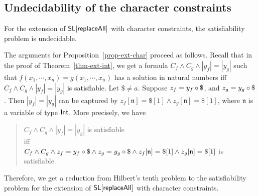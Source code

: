 
\subsection{Undecidability of the character constraints}

\begin{proposition}\label{prop-ext-char}
	For the extension of $\mathsf{SL}[\mathsf{replaceAll}]$ with character constraints, the satisfiability problem is undecidable. 
\end{proposition}

The arguments for Proposition~\ref{prop-ext-char} proceed as follows. Recall that in the proof of Theorem~\ref{thm-ext-int}, we get a formula $C_f \wedge C_g \wedge |y_f| = |y_g|$ such that $f(x_1,\cdots, x_n) = g(x_1,\cdots, x_n)$ has a solution in natural numbers iff $C_f \wedge C_g \wedge |y_f| = |y_g|$ is satisfiable. Let $\$ \neq a$. Suppose  $z_f = y_f \concat \$$, and $z_g = y_g \concat \$$. Then $|y_f| = |y_g|$ can be captured by $z_f[\mathfrak{n}] = \$[1] \wedge  z_g[\mathfrak{n}] = \$[1]$, where $\mathfrak{n}$ is a variable of type ${\sf Int}$. More precisely, 
%
we have 
\begin{quote}
	\centering
	$C_f \wedge C_g \wedge |y_f|= |y_g|$ is satisfiable \\
	iff \\
	$C_f \wedge C_g \wedge z_f = y_f \circ \$ \wedge z_g = y_g \circ \$ \wedge z_f[\mathfrak{n}] = \$[1] \wedge  z_g[\mathfrak{n}] = \$[1]$ is satisfiable. 
\end{quote}
Therefore, we get a reduction from Hilbert's tenth problem to the satisfiability problem for the extension of $\mathsf{SL}[\mathsf{replaceAll}]$ with character constraints. 

